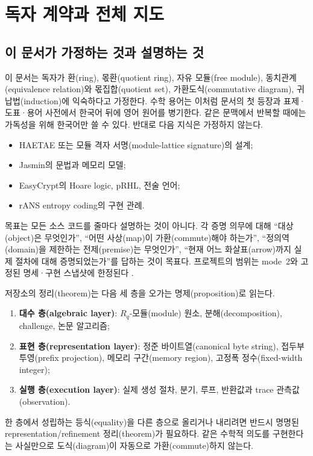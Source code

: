 \section{독자 계약과 전체 지도}
\label{sec:reading-contract}

\subsection{이 문서가 가정하는 것과 설명하는 것}

이 문서는 독자가 환(ring), 몫환(quotient ring), 자유 모듈(free module),
동치관계(equivalence relation)와 몫집합(quotient set),
가환도식(commutative diagram), 귀납법(induction)에 익숙하다고 가정한다.
수학 용어는 이처럼 문서의 첫 등장과 표제·도표·용어 사전에서 한국어 뒤에 영어 원어를
병기한다. 같은 문맥에서 반복할 때에는 가독성을 위해 한국어만 쓸 수 있다. 반대로
다음 지식은 가정하지 않는다.

\begin{itemize}
  \item HAETAE 또는 모듈 격자 서명(module-lattice signature)의 설계;
  \item Jasmin의 문법과 메모리 모델;
  \item EasyCrypt의 Hoare logic, pRHL, 전술 언어;
  \item rANS entropy coding의 구현 관례.
\end{itemize}

목표는 모든 소스 코드를 줄마다 설명하는 것이 아니다. 각 증명 의무에 대해
``대상(object)은 무엇인가'', ``어떤 사상(map)이 가환(commute)해야 하는가'',
``정의역(domain)을 제한하는 전제(premise)는 무엇인가'', ``현재 어느
화살표(arrow)까지 실제 절차에 대해 증명되었는가''를
답하는 것이 목표다. 프로젝트의 범위는 mode~2와 고정된 명세·구현 스냅샷에
한정된다 \cite{project-scope}.

\begin{translation}[세 층 번역]
저장소의 정리(theorem)는 다음 세 층을 오가는 명제(proposition)로 읽는다.
\begin{enumerate}
  \item \textbf{대수 층(algebraic layer)}: \(R_q\)-모듈(module) 원소,
        분해(decomposition), challenge, 논문 알고리즘;
  \item \textbf{표현 층(representation layer)}: 정준 바이트열(canonical byte
        string), 접두부 투영(prefix projection), 메모리 구간(memory region),
        고정폭 정수(fixed-width integer);
  \item \textbf{실행 층(execution layer)}: 실제 생성 절차, 분기, 루프,
        반환값과 trace 관측값(observation).
\end{enumerate}
한 층에서 성립하는 등식(equality)을 다른 층으로 올리거나 내리려면 반드시 명명된
representation/refinement 정리(theorem)가 필요하다. 같은 수학적 의도를 구현한다는
사실만으로 도식(diagram)이 자동으로 가환(commute)하지 않는다.
\end{translation}


